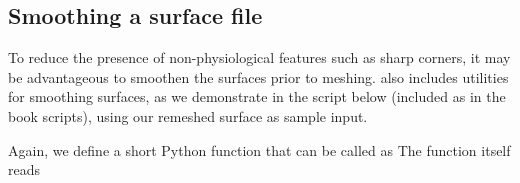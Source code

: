 \subsection{Smoothing a surface file}
\label{subsubsec:chp3:mesh-creation:smoothing}

To reduce the presence of non-physiological features such as sharp
corners, it may be advantageous to smoothen the surfaces prior to
meshing. \svmtk{} also includes utilities for smoothing surfaces, as
we demonstrate in the script below (included as
 in the book scripts), using
our remeshed surface  as sample input.

%
%
Again, we define a short Python function
 that can be called as
\noindent The function itself reads

